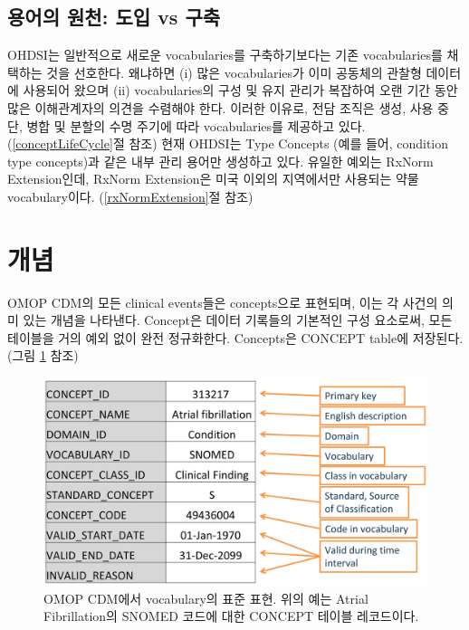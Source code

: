 \documentclass[11pt]{book}
\theoremstyle{definition}
\theoremstyle{definition}
\theoremstyle{definition}
\theoremstyle{remark}
\begin{document}
\subsection{용어의 원천: 도입 vs 구축}\label{---vs-}

OHDSI는 일반적으로 새로운 vocabularies를 구축하기보다는 기존
vocabularies를 채택하는 것을 선호한다. 왜냐하면 (i) 많은 vocabularies가
이미 공동체의 관찰형 데이터에 사용되어 왔으며 (ii) vocabularies의 구성
및 유지 관리가 복잡하여 오랜 기간 동안 많은 이해관계자의 의견을 수렴해야
한다. 이러한 이유로, 전담 조직은 생성, 사용 중단, 병합 및 분할의 수명
주기에 따라 vocabularies를 제공하고 있다. (\ref{conceptLifeCycle}절
참조) 현재 OHDSI는 Type Concepts (예를 들어, condition type concepts)과
같은 내부 관리 용어만 생성하고 있다. 유일한 예외는 RxNorm Extension인데,
RxNorm Extension은 미국 이외의 지역에서만 사용되는 약물 vocabulary이다.
(\ref{rxNormExtension}절 참조)

\section{개념}

OMOP CDM의 모든 clinical events들은 concepts으로 표현되며, 이는 각
사건의 의미 있는 개념을 나타낸다. Concept은 데이터 기록들의 기본적인
구성 요소로써, 모든 테이블을 거의 예외 없이 완전 정규화한다. Concepts은
CONCEPT table에 저장된다. (그림 \ref{fig:concept} 참조) 

\begin{figure}

{\centering \includegraphics[width=0.9\linewidth]{images/StandardizedVocabularies/concept} 

}

\caption{OMOP CDM에서 vocabulary의 표준 표현. 위의 예는 Atrial Fibrillation의 SNOMED 코드에 대한 CONCEPT 테이블 레코드이다.}\label{fig:concept}
\end{figure}
\end{document}
